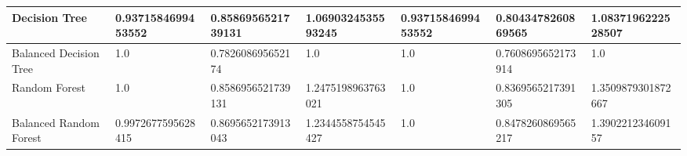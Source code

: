 \documentclass{article}
\begin{document}
\begin{table}[]
\begin{tabular}{l|lll|lll|}
\multicolumn{1}{|l|}{Decision Tree}                & \multicolumn{1}{l|}{0.9371584699453552} & \multicolumn{1}{l|}{0.8586956521739131} & 1.0690324535593245                   & \multicolumn{1}{l|}{0.9371584699453552} & \multicolumn{1}{l|}{0.8043478260869565} & 1.0837196222528507                   \\ \hline
\multicolumn{1}{|l|}{Balanced Decision Tree}       & \multicolumn{1}{l|}{1.0}                & \multicolumn{1}{l|}{0.782608695652174}  & 1.0                                  & \multicolumn{1}{l|}{1.0}                & \multicolumn{1}{l|}{0.7608695652173914} & 1.0                                  \\ \hline
\multicolumn{1}{|l|}{Random Forest}                & \multicolumn{1}{l|}{1.0}                & \multicolumn{1}{l|}{0.8586956521739131} & 1.2475198963763021                   & \multicolumn{1}{l|}{1.0}                & \multicolumn{1}{l|}{0.8369565217391305} & 1.3509879301872667                   \\ \hline
\multicolumn{1}{|l|}{Balanced Random Forest}       & \multicolumn{1}{l|}{0.9972677595628415} & \multicolumn{1}{l|}{0.8695652173913043} & 1.2344558754545427                   & \multicolumn{1}{l|}{1.0}                & \multicolumn{1}{l|}{0.8478260869565217} & 1.390221234609157                    \\ \hline
\end{tabular}
\end{table}
\end{document}
